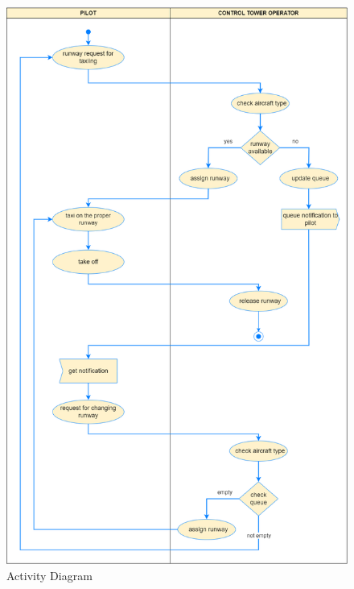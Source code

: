 \documentclass{article}
\begin{document}
\begin{sloppy}
\bigbreak
\begin{figure}[H]
    \centering
    \includegraphics[scale=0.32]{figure10.png}
    \caption{Activity Diagram}
    \label{fig:enter-label}
\end{figure}
\bigbreak


\end{sloppy}
\end{document}
